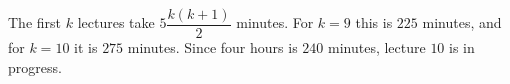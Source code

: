 The first $k$ lectures take $5\dfrac{k(k+1)}{2}$ minutes. For $k=9$ this is $225$ minutes, and for $k=10$ it is $275$ minutes. Since four hours is $240$ minutes, lecture $\boxed{10}$ is in progress.
